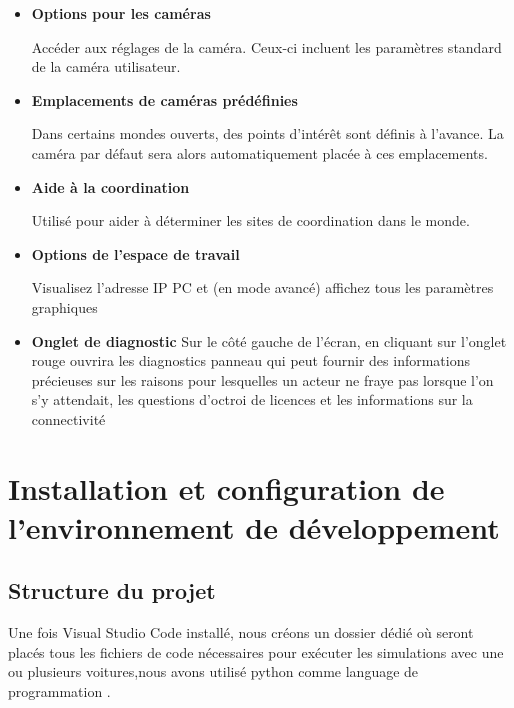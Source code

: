 \documentclass[12pt, a4paper]{report}
\begin{document}
\begin{itemize}
    Dialogue répertoriant toutes les caméras actives. Ce dialogue affiche la liste de toutes les caméras actuellement actives dans la scène. Tout acteur intégrant des caméras, comme ceux utilisant QCar ou QBot Platform, y ajoute automatiquement ses caméras lorsqu'il est généré dans le monde. Les caméras utilisateur peuvent également être ajoutées manuellement.
    
    \item \textbf{Options pour les caméras}
    
    Accéder aux réglages de la caméra. Ceux-ci incluent les paramètres standard de la caméra utilisateur.
    
    \item \textbf{Emplacements de caméras prédéfinies}
    
    Dans certains mondes ouverts, des points d'intérêt sont définis à l'avance. La caméra par défaut sera alors automatiquement placée à ces emplacements.
    
    \item \textbf{Aide à la coordination}
    
    Utilisé pour aider à déterminer les sites de coordination dans le monde.
    
    
 \item \textbf{Options de l'espace de travail}
    
    Visualisez  l'adresse IP PC et (en mode avancé) affichez tous les paramètres graphiques
 \item     \textbf{ Onglet de diagnostic}
 Sur le côté gauche de l'écran, en cliquant sur l'onglet rouge ouvrira les diagnostics panneau qui peut fournir des informations précieuses sur les raisons pour lesquelles un acteur ne fraye pas lorsque l'on s'y attendait, les questions d'octroi de licences et les informations sur la connectivité
 \end{itemize}

\newpage
\section{Installation et configuration de l'environnement de développement}

\subsection{Structure du projet}
Une fois Visual Studio Code installé, nous créons un dossier dédié où seront placés tous les fichiers de code nécessaires pour exécuter les simulations avec une ou plusieurs voitures,nous avons utilisé python comme language de programmation  .
\end{document}
